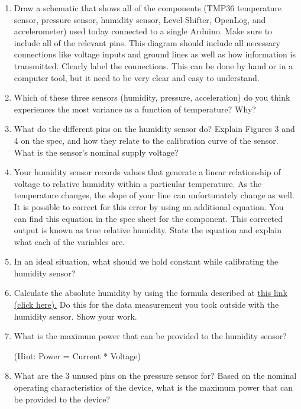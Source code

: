 \documentclass[12pt]{article}
\begin{document}
	\begin{enumerate}
		\item Draw a schematic that shows all of the components (TMP36 temperature sensor, pressure sensor, humidity sensor, Level-Shifter, OpenLog, and accelerometer) used today connected to a single Arduino. Make sure to include all of the relevant pins. This diagram should include all necessary connections like voltage inputs and ground lines as well as how information is transmitted. Clearly label the connections. This can be done by hand or in a computer tool, but it need to be very clear and easy to understand.
		
		\item Which of these three sensors (humidity, pressure, acceleration) do you think experiences the most variance as a function of temperature? Why?
		
		\item What do the different pins on the humidity sensor do? Explain Figures 3 and 4 on the spec, and how they relate to the calibration curve of the sensor. What is the sensor's nominal supply voltage?
		
		\item Your humidity sensor records values that generate a linear relationship of voltage to relative humidity within a particular temperature. As the temperature changes, the slope of your line can unfortunately change as well. It is possible to correct for this error by using an additional equation. You can find this equation in the spec sheet for the component. This corrected output is known as true relative humidity. State the equation and explain what each of the variables are.
		
		\item In an ideal situation, what should we hold constant while calibrating the humidity sensor?
		
		\item Calculate the absolute humidity by using the formula described at \href{https://carnotcycle.wordpress.com/2012/08/04/how-to-convert-relative-humidity-to-absolute-humidity/}{this link (click here).} Do this for the data measurement you took outside with the humidity sensor. Show your work.
		
		\item What is the maximum power that can be provided to the humidity sensor?
		
		(Hint: Power = Current * Voltage)
		
		\item What are the 3 unused pins on the pressure sensor for? Based on the nominal operating characteristics of the device, what is the maximum power that can be provided to the device?
		

\end{enumerate}
\end{document}
